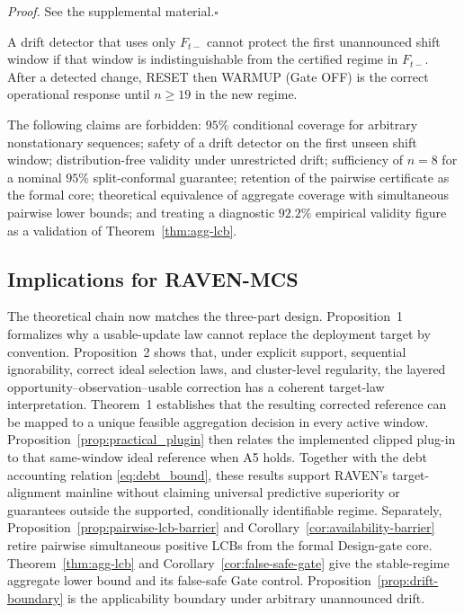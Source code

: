 \documentclass[letterpaper,journal]{IEEEtran}
\begin{document}
\noindent\emph{Proof.}
See the supplemental material.\hfill$\square$

A drift detector that uses only $F_{t-}$ cannot protect the first unannounced
shift window if that window is indistinguishable from the certified regime in
$F_{t-}$.  After a detected change, RESET then WARMUP (Gate OFF) is the
correct operational response until $n\ge 19$ in the new regime.

The following claims are forbidden: $95\%$ conditional coverage for arbitrary
nonstationary sequences; safety of a drift detector on the first unseen shift
window; distribution-free validity under unrestricted drift; sufficiency of
$n=8$ for a nominal $95\%$ split-conformal guarantee; retention of the pairwise
certificate as the formal core; theoretical equivalence of aggregate coverage
with simultaneous pairwise lower bounds; and treating a diagnostic $92.2\%$
empirical validity figure as a validation of Theorem~\ref{thm:agg-lcb}.

\subsection{Implications for RAVEN-MCS}
\label{subsec:theory_implications}

The theoretical chain now matches the three-part design.  Proposition~1
formalizes why a usable-update law cannot replace the deployment target by
convention.  Proposition~2 shows that, under explicit support, sequential
ignorability, correct ideal selection laws, and cluster-level regularity, the
layered opportunity--observation--usable correction has a coherent target-law
interpretation.  Theorem~1 establishes that the resulting corrected reference
can be mapped to a unique feasible aggregation decision in every active window.
Proposition~\ref{prop:practical_plugin} then relates the implemented
clipped plug-in to that same-window ideal reference when A5 holds.
Together with the debt accounting relation
\eqref{eq:debt_bound}, these results support RAVEN's target-alignment mainline
without claiming universal predictive superiority or guarantees outside the
supported, conditionally identifiable regime.  Separately,
Proposition~\ref{prop:pairwise-lcb-barrier} and
Corollary~\ref{cor:availability-barrier} retire pairwise simultaneous positive
LCBs from the formal Design-gate core.
Theorem~\ref{thm:agg-lcb} and Corollary~\ref{cor:false-safe-gate} give the
stable-regime aggregate lower bound and its false-safe Gate control.
Proposition~\ref{prop:drift-boundary} is the applicability boundary under
arbitrary unannounced drift.
\end{document}
